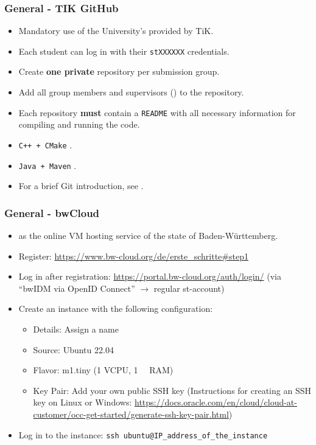 \begin{frame}
  \frametitle{General - TIK GitHub}
  \begin{itemize}
    \item Mandatory use of the University's provided  by TiK.
    \item Each student can log in with their \texttt{stXXXXXX} credentials.
    \item Create \textbf{one private} repository per submission group.
    \item Add all group members and supervisors (\supervisorAc) to the repository.
    \item Each repository \textbf{must} contain a \texttt{README} with all necessary information for compiling and running the code.
    \item \texttt{C++ + CMake} .
    \item \texttt{Java + Maven} .
    \url{}
    \item For a brief Git introduction, see .
  \end{itemize}
\end{frame}

\begin{frame}
  \frametitle{General - bwCloud}
  \begin{itemize}
    \item {} as the online VM hosting service of the state of Baden-Württemberg.
    \item Register: \url{https://www.bw-cloud.org/de/erste_schritte\#step1}
    \item Log in after registration: \url{https://portal.bw-cloud.org/auth/login/} (via \enquote{bwIDM via OpenID Connect} $\rightarrow$ regular st-account)
    \item Create an instance with the following configuration:
    \begin{itemize}
        \item Details: Assign a name
        \item Source: Ubuntu 22.04
        \item Flavor: m1.tiny (1 VCPU, \SI{1}{\giga\byte} RAM)
        \item Key Pair: Add your own public SSH key (Instructions for creating an SSH key on Linux or Windows: \url{https://docs.oracle.com/en/cloud/cloud-at-customer/occ-get-started/generate-ssh-key-pair.html})
    \end{itemize}
    \item Log in to the instance: \texttt{ssh ubuntu@IP\_address\_of\_the\_instance}
  \end{itemize}
\end{frame}


